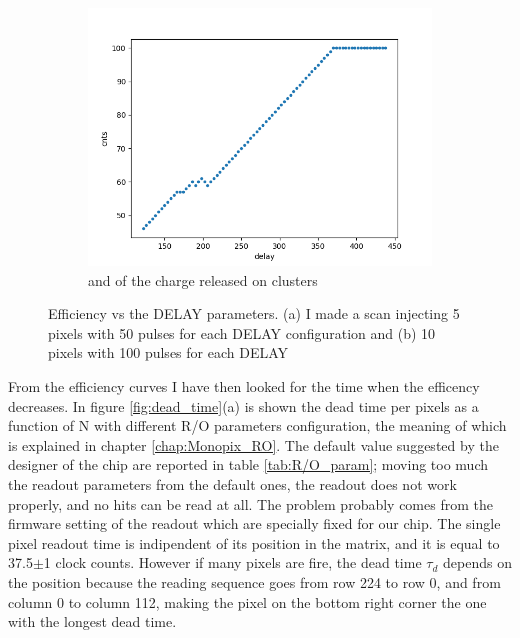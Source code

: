 \begin{figure}
\begin{subfigure}[b]{0.49\textwidth}
                \includegraphics[width=\linewidth]{figures/charaterization/efficiency_10pixels.png}
                \caption{and of the charge released on clusters}
                \label{fig:efficiency_10_pixels}
            \end{subfigure}
            \caption{Efficiency vs the DELAY parameters. (a) I made a scan injecting 5 pixels with 50 pulses for each DELAY configuration and (b) 10 pixels with 100 pulses for each DELAY}
            \label{fig:efficiency_VS_delay}
        \end{figure} 

        From the efficiency curves I have then looked for the time when the efficency decreases. In figure \ref{fig:dead_time}(a) is shown the dead time per pixels as a function of N with different R/O parameters configuration, the meaning of which is explained in chapter \ref{chap:Monopix_RO}. The default value suggested by the designer of the chip are reported in table \ref{tab:R/O_param}; moving too much the readout parameters from the default ones, the readout does not work properly, and no hits can be read at all. The problem probably comes from the firmware setting of the readout which are specially fixed for our chip.
        The single pixel readout time is indipendent of its position in the matrix, and it is equal to 37.5$\pm$1 clock counts. However if many pixels are fire, the dead time $\tau_d$ depends on the position because the reading sequence goes from row 224 to row 0, and from column 0 to column 112, making the pixel on the bottom right corner the one with the longest dead time. 
       
